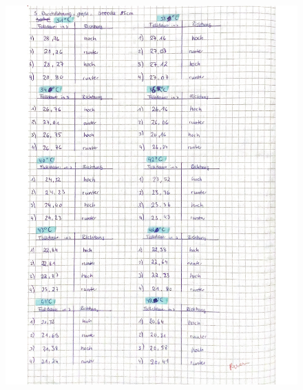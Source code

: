 \begin{figure}[H]
  \centering
  \includegraphics[width=\textwidth]{Messwerte_2.pdf}
  \label{fig:Messungen_2}
\end{figure}